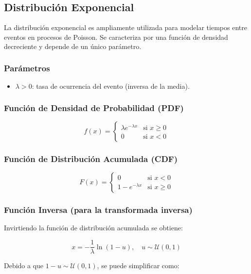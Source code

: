 \documentclass{article}
\begin{document}
\subsection{Distribución Exponencial}

La distribución exponencial es ampliamente utilizada para modelar tiempos entre eventos en procesos de Poisson. Se caracteriza por una función de densidad decreciente y depende de un único parámetro.

\subsubsection*{Parámetros}

\begin{itemize}
  \item $\lambda > 0$: tasa de ocurrencia del evento (inversa de la media).
\end{itemize}

\subsubsection*{Función de Densidad de Probabilidad (PDF)}

\[
f(x) =
\begin{cases}
\lambda e^{-\lambda x} & \text{si } x \geq 0 \\
0 & \text{si } x < 0
\end{cases}
\]

\subsubsection*{Función de Distribución Acumulada (CDF)}

\[
F(x) =
\begin{cases}
0 & \text{si } x < 0 \\
1 - e^{-\lambda x} & \text{si } x \geq 0
\end{cases}
\]

\subsubsection*{Función Inversa (para la transformada inversa)}

Invirtiendo la función de distribución acumulada se obtiene:

\[
x = -\frac{1}{\lambda} \ln(1 - u), \quad u \sim \mathcal{U}(0,1)
\]

Debido a que $1 - u \sim \mathcal{U}(0,1)$, se puede simplificar como:
\end{document}
